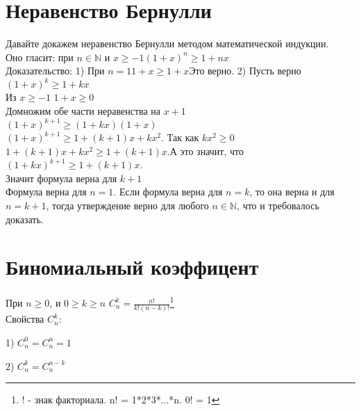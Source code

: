 \documentclass[a4paper,12pt]{article}
\begin{document}
\section{Неравенство Бернулли}
Давайте докажем неравенство Бернулли методом математической индукции.\\
Оно гласит: при $n\in\mathbb{N}$ и $x\geq-1$\hspace{50pt}$(1+x)^n\geq 1+nx$\\
Доказательство:
1) При $n=1$\hspace{50pt}$1+x\geq1+x$\hspace{50pt}Это верно.
2) Пусть верно $(1+x)^k\geq1+kx$\\
Из $x\geq-1$ \hspace{10pt} $1+x\geq0$\\
Домножим обе части неравенства на $x+1$\\
$(1+x)^{k+1}\geq(1+kx)(1+x)$\\
$(1+x)^{k+1}\geq1+(k+1)x+kx^2$.\hspace{10pt} Так как $kx^2\geq0$\\
$1+(k+1)x+kx^2\geq1+(k+1)x$.\hspace{10pt}А это значит, что\\
$(1+kx)^{k+1}\geq1+(k+1)x$.\\
Значит формула верна для $k+1$\\
Формула верна для $n = 1$. Если формула верна для $n=k$, то она верна и для $n=k+1$, тогда утверждение верно для любого $n\in\mathbb{N}$, что и требовалось доказать.

\section{Биномиальный коэффицент}
При $n\geq 0$, и $0\geq k\geq n$ \hspace{10pt} $C_{n}^k = \frac{n!}{k!(n-k)!}$\footnote{! - знак факториала. n! = 1*2*3*...*n. 0! = 1}\\
Свойства $C_{n}^k$:

1) $C_{n}^0 = C_{n}^n = 1$

2) $C_{n}^k = C_{n}^{n-k}$
\end{document}
